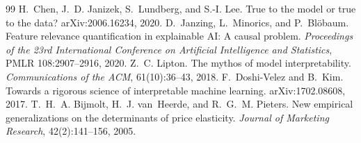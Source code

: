 \begin{thebibliography}{99}
 H.~Chen, J.~D. Janizek, S.~Lundberg, and S.-I. Lee. True to the model or true to the data? arXiv:2006.16234, 2020.
 D.~Janzing, L.~Minorics, and P.~Bl\"obaum. Feature relevance quantification in explainable AI: A causal problem. \emph{Proceedings of the 23rd International Conference on Artificial Intelligence and Statistics}, PMLR 108:2907--2916, 2020.
 Z.~C. Lipton. The mythos of model interpretability. \emph{Communications of the ACM}, 61(10):36--43, 2018.
 F.~Doshi-Velez and B.~Kim. Towards a rigorous science of interpretable machine learning. arXiv:1702.08608, 2017.
 T.~H.~A. Bijmolt, H.~J. van~Heerde, and R.~G.~M. Pieters. New empirical generalizations on the determinants of price elasticity. \emph{Journal of Marketing Research}, 42(2):141--156, 2005.
\end{thebibliography}
